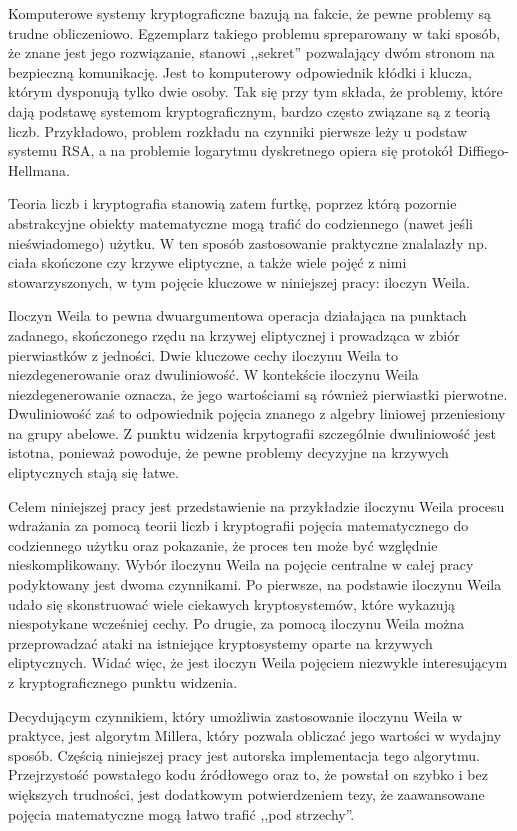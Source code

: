 \noindent
Komputerowe systemy kryptograficzne bazują na fakcie,
że pewne problemy są trudne obliczeniowo.
Egzemplarz takiego problemu spreparowany w taki sposób,
że znane jest jego rozwiązanie,
stanowi ,,sekret'' pozwalający dwóm stronom na bezpieczną komunikację.
Jest to komputerowy odpowiednik kłódki i klucza,
którym dysponują tylko dwie osoby.
Tak się przy tym składa,
że problemy, które dają podstawę systemom kryptograficznym,
bardzo często związane są z teorią liczb.
Przykładowo, problem rozkładu na czynniki pierwsze leży u podstaw systemu RSA,
a na problemie logarytmu dyskretnego opiera się protokół Diffiego-Hellmana.

\noindent
Teoria liczb i kryptografia stanowią zatem furtkę,
poprzez którą pozornie abstrakcyjne obiekty matematyczne
mogą trafić do codziennego (nawet jeśli nieświadomego) użytku.
W ten sposób zastosowanie praktyczne znalalazły
np. ciała skończone czy krzywe eliptyczne,
a także wiele pojęć z nimi stowarzyszonych,
w tym pojęcie kluczowe w niniejszej pracy: iloczyn Weila.

\noindent
Iloczyn Weila to pewna dwuargumentowa operacja działająca
na punktach zadanego, skończonego rzędu na krzywej eliptycznej
i prowadząca w zbiór pierwiastków z jedności.
Dwie kluczowe cechy iloczynu Weila to niezdegenerowanie
oraz dwuliniowość.
W kontekście iloczynu Weila niezdegenerowanie oznacza,
że jego wartościami są również pierwiastki pierwotne.
Dwuliniowość zaś to odpowiednik pojęcia znanego z algebry liniowej
przeniesiony na grupy abelowe.
Z punktu widzenia krpytografii
szczególnie dwuliniowość jest istotna, ponieważ powoduje,
że pewne problemy decyzyjne na krzywych eliptycznych stają się łatwe.

\noindent
Celem niniejszej pracy jest przedstawienie na przykładzie iloczynu Weila
procesu wdrażania za pomocą teorii liczb i kryptografii
pojęcia matematycznego do codziennego użytku
oraz pokazanie, że proces ten może być względnie nieskomplikowany.
Wybór iloczynu Weila na pojęcie centralne w całej pracy
podyktowany jest dwoma czynnikami.
Po pierwsze, na podstawie iloczynu Weila udało się skonstruować
wiele ciekawych kryptosystemów,
które wykazują niespotykane wcześniej cechy.
Po drugie, za pomocą iloczynu Weila można przeprowadzać
ataki na istniejące kryptosystemy oparte na krzywych eliptycznych.
Widać więc, że jest iloczyn Weila pojęciem niezwykle interesującym
z kryptograficznego punktu widzenia.

\noindent
Decydującym czynnikiem,
który umożliwia zastosowanie iloczynu Weila w praktyce,
jest algorytm Millera, który pozwala obliczać jego wartości w wydajny sposób.
Częścią niniejszej pracy jest autorska implementacja tego algorytmu.
Przejrzystość powstałego kodu źródłowego
oraz to, że powstał on szybko i bez większych trudności,
jest dodatkowym potwierdzeniem tezy,
że zaawansowane pojęcia matematyczne mogą łatwo trafić ,,pod strzechy''.

